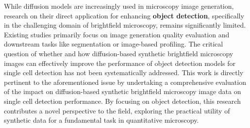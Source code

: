 While diffusion models are increasingly used in microscopy image generation, research on their direct application for enhancing \textbf{object detection}, specifically in the challenging domain of brightfield microscopy, remains significantly limited.
Existing studies primarily focus on image generation quality evaluation and downstream tasks like segmentation or image-based profiling.
The critical question of whether and how diffusion-based synthetic brightfield microscopy images can effectively improve the performance of object detection models for single cell detection has not been systematically addressed.
This work is directly pertinent to the aforementioned issue by undertaking a comprehensive evaluation of the impact on diffusion-based synthetic brightfield microscopy image data on single cell detection performance.
By focusing on object detection, this research contributes a novel perspective to the field, exploring the practical utility of synthetic data for a fundamental task in quantitative microscopy.
